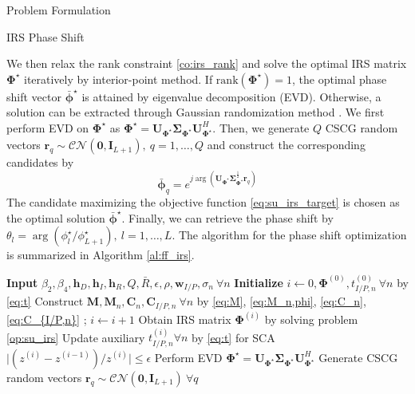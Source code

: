 \documentclass{IEEEtran}
\begin{document}
\begin{section}{Problem Formulation}
\begin{subsection}{IRS Phase Shift}
\begin{maxi!}
		\end{maxi!}
		We then relax the rank constraint \ref{co:irs_rank} and solve the optimal IRS matrix $\boldsymbol{\Phi}^{\star}$ iteratively by interior-point method. If $\mathrm{rank}(\boldsymbol{\Phi}^{\star})=1$, the optimal phase shift vector $\bar{\boldsymbol{\phi}}^\star$ is attained by eigenvalue decomposition (EVD). Otherwise, a solution can be extracted through Gaussian randomization method \cite{Huang2010}. We first perform EVD on $\boldsymbol{\Phi}^{\star}$ as $\boldsymbol{\Phi}^{\star}=\boldsymbol{U}_{\boldsymbol{\Phi}^{\star}}\boldsymbol{\Sigma}_{\boldsymbol{\Phi}^{\star}}\boldsymbol{U}_{\boldsymbol{\Phi}^{\star}}^H$. Then, we generate $Q$ CSCG random vectors $\boldsymbol{r}_q \sim \mathcal{CN}(\boldsymbol{0},\boldsymbol{I}_{L+1}),\ q=1,\dots,Q$ and construct the corresponding candidates by
		\begin{equation}
			\bar{\boldsymbol{\phi}}_q=e^{j\arg\left(\boldsymbol{U}_{\boldsymbol{\Phi}^{\star}}\boldsymbol{\Sigma}_{\boldsymbol{\Phi}^{\star}}^{\frac{1}{2}}\boldsymbol{r}_q\right)}
		\end{equation}
		The candidate maximizing the objective function \ref{eq:su_irs_target} is chosen as the optimal solution $\bar{\boldsymbol{\phi}}^\star$. Finally, we can retrieve the phase shift by $\theta_l=\arg(\phi_l^\star/\phi_{L+1}^\star), \ l=1,\dots,L$. The algorithm for the phase shift optimization is summarized in Algorithm \ref{al:ff_irs}.
		\begin{algorithm}
			\caption{IRS Phase Shift}
			\label{al:ff_irs}
			\begin{algorithmic}[1]
				\State \textbf{Input} $\beta_2,\beta_4,\boldsymbol{h}_D,\boldsymbol{h}_I,\boldsymbol{h}_R,Q,\bar{R},\epsilon,\rho,\boldsymbol{w}_{I/P},\sigma_n \ \forall n$
				\State \textbf{Initialize} $i \gets 0,\boldsymbol{\Phi}^{(0)},t_{I/P,n}^{(0)}\ \forall n$ by \ref{eq:t}
				\State Construct $\boldsymbol{M},\boldsymbol{M}_n,\boldsymbol{C}_{n},\boldsymbol{C}_{I/P,n} \ \forall n$ by \ref{eq:M}, \ref{eq:M_n,phi}, \ref{eq:C_n}, \ref{eq:C_{I/P,n}}
				\Repeat;
				\State $i \gets i + 1$
				\State Obtain IRS matrix $\boldsymbol{\Phi}^{(i)}$ by solving problem \ref{op:su_irs}
				\State Update auxiliary $t_{I/P,n}^{(i)} \forall n$ by \ref{eq:t} for SCA
				\Until $\lvert (z^{(i)}-z^{(i-1)}) / z^{(i)} \rvert \le \epsilon$
				\State Perform EVD $\boldsymbol{\Phi}^{\star}=\boldsymbol{U}_{\boldsymbol{\Phi}^{\star}}\boldsymbol{\Sigma}_{\boldsymbol{\Phi}^{\star}}\boldsymbol{U}_{\boldsymbol{\Phi}^{\star}}^H$
				\State Generate CSCG random vectors $\boldsymbol{r}_q \sim \mathcal{CN}(\boldsymbol{0},\boldsymbol{I}_{L+1}) \ \forall q$

\end{algorithmic}
\end{algorithm}
\end{subsection}
\end{section}
\end{document}
